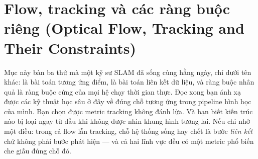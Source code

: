 \documentclass[../../../deep_learning.tex]{subfiles}
\begin{document}
\section{Flow, tracking và các ràng buộc riêng (Optical Flow, Tracking and Their Constraints)}

\begin{tomtat}
Mục này bàn ba thứ mà một kỹ sư SLAM đã sống cùng hằng ngày, chỉ dưới tên khác:  là bài toán tương ứng điểm,  là bài toán liên kết dữ liệu, và ràng buộc nhân quả là ràng buộc cứng của mọi hệ chạy thời gian thực. Đọc xong bạn ánh xạ được các kỹ thuật học sâu ở đây về đúng chỗ tương ứng trong pipeline hình học của mình. Bạn chọn được metric tracking không đánh lừa. Và bạn biết kiến trúc nào bị loại ngay từ đầu khi không được nhìn khung hình tương lai. Nếu chỉ nhớ một điều: trong cả flow lẫn tracking, chỗ hệ thống sống hay chết là bước \emph{liên kết} chứ không phải bước phát hiện --- và cả hai lĩnh vực đều có một metric phổ biến che giấu đúng chỗ đó.
\end{tomtat}
\end{document}
